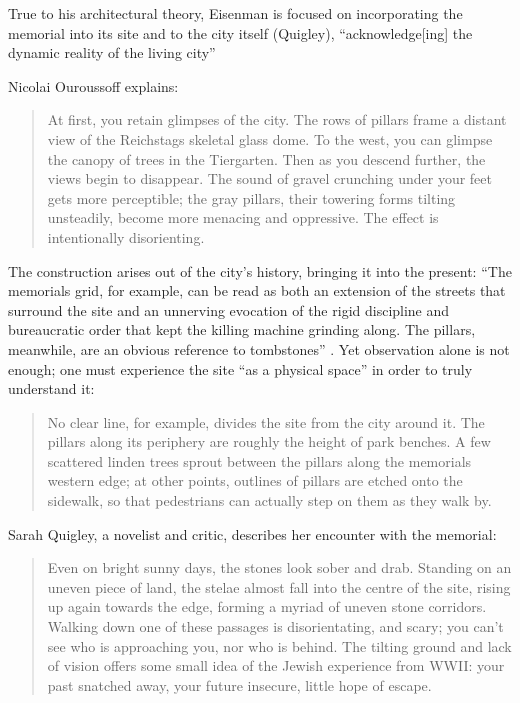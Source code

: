 True to his architectural theory, Eisenman is focused on
incorporating the memorial into its site and to the city itself
(Quigley), “acknowledge[ing] the dynamic reality of the living city” \citep[][pg. 207]{eisenman2004}

Nicolai Ouroussoff explains: 


\begin{quote}
At first, you retain glimpses of the city.  The rows
of pillars frame a distant view of the Reichstag{\textquotesingle}s
skeletal glass dome.  To the west, you can glimpse the canopy of trees
in the Tiergarten.  Then as you descend further, the views begin to
disappear.  The sound of gravel crunching under your feet gets more
perceptible; the gray pillars, their towering forms tilting unsteadily,
become more menacing and oppressive.  The effect is intentionally
disorienting. \citep{ouroussoff2005}
\end{quote}

The construction arises out of the city’s history,
bringing it into the present: “The memorial{\textquotesingle}s grid,
for example, can be read as both an extension of the streets that
surround the site and an unnerving evocation of the rigid discipline
and bureaucratic order that kept the killing machine grinding along. 
The pillars, meanwhile, are an obvious reference to tombstones” \citep{ouroussoff2005}.  
Yet observation alone is not enough; one must
experience the site “as a physical space” in order to truly understand
it: 

\begin{quote}
No clear line, for example, divides the site from the
city around it.  The pillars along its periphery are roughly the height
of park benches.  A few scattered linden trees sprout between the
pillars along the memorial{\textquotesingle}s western edge; at other
points, outlines of pillars are etched onto the sidewalk, so that
pedestrians can actually step on them as they walk by. \citep{ouroussoff2005}
\end{quote}

Sarah Quigley, a novelist and critic, describes her encounter with the
memorial: 

\begin{quote}
Even on bright sunny days, the
stones look sober and drab.  Standing on an uneven piece of land, the
stelae almost fall into the centre of the site, rising up again towards
the edge, forming a myriad of uneven stone corridors.  Walking down one
of these passages is disorientating, and scary; you can’t see who is
approaching you, nor who is behind.  The tilting ground and lack of
vision offers some small idea of the Jewish experience from WWII: your
past snatched away, your future insecure, little hope of escape. \citep{quigley2005}
\end{quote}

